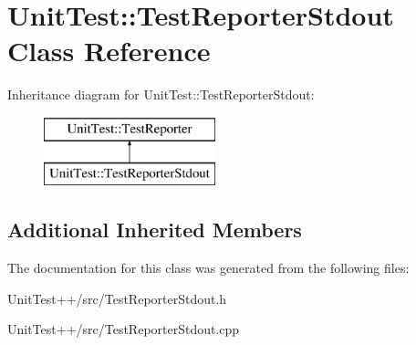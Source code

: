 \hypertarget{classUnitTest_1_1TestReporterStdout}{\section{Unit\-Test\-:\-:Test\-Reporter\-Stdout Class Reference}
\label{classUnitTest_1_1TestReporterStdout}
}
Inheritance diagram for Unit\-Test\-:\-:Test\-Reporter\-Stdout\-:\begin{figure}[H]
\begin{center}
\leavevmode
\includegraphics[height=2.000000cm]{classUnitTest_1_1TestReporterStdout}
\end{center}
\end{figure}
\subsection*{Additional Inherited Members}


The documentation for this class was generated from the following files\-:\begin{DoxyCompactItemize}
\item 
Unit\-Test++/src/Test\-Reporter\-Stdout.\-h\item 
Unit\-Test++/src/Test\-Reporter\-Stdout.\-cpp\end{DoxyCompactItemize}
